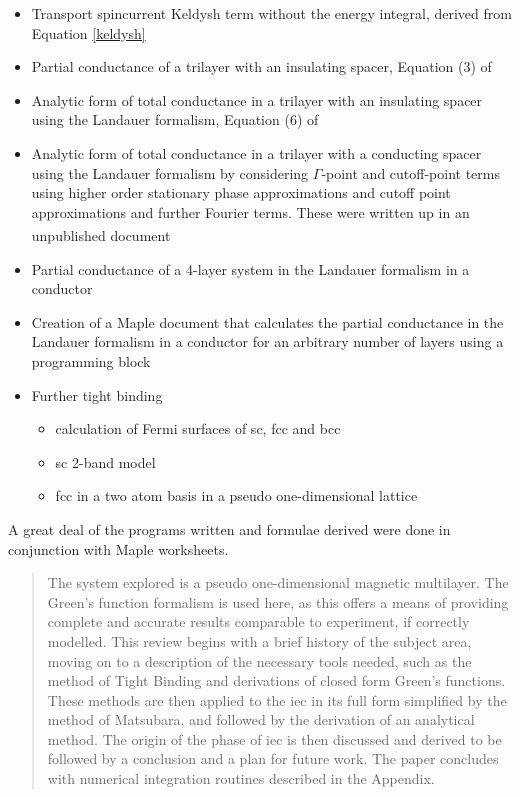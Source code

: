 \documentclass[a4paper, 12pt]{article}
\newcommand{\site}[1]{\textsuperscript{\textcolor{blue}{\cite{#1}}}}
\begin{document}
\begin{itemize}
	\item{Transport spincurrent Keldysh term without the energy integral, derived from Equation \eqref{keldysh}}
	\item{Partial conductance of a trilayer with an insulating spacer, Equation (3) of \textcolor{blue}{\cite{Mathon2016}}}
	\item{Analytic form of total conductance in a trilayer with an insulating spacer using the Landauer formalism, Equation (6) of \textcolor{blue}{\cite{Mathon2016}}}
	\item{Analytic form of total conductance in a trilayer with a conducting spacer using the Landauer formalism by considering $\Gamma$-point and cutoff-point terms using higher order stationary phase approximations and cutoff point approximations and further Fourier terms. These were written up in an unpublished document\site{me}}
	\item{Partial conductance of a 4-layer system in the Landauer formalism in a conductor}
	\item{Creation of a Maple document that calculates the partial conductance in the Landauer formalism in a conductor for an arbitrary number of layers using a programming block}
	\item{Further tight binding}
		\begin{itemize}
			\item{calculation of Fermi surfaces of \gls{sc}, \gls{fcc} and \acrfull{bcc}}
			\item{\gls{sc} 2-band model}
			\item{\gls{fcc} in a two atom basis in a pseudo one-dimensional lattice}
		\end{itemize}
\end{itemize}
A great deal of the programs written and formulae derived were done in conjunction with Maple worksheets.
\\[9mm]
	\begin{abstract}
		The system explored is a pseudo one-dimensional magnetic multilayer. The Green's function formalism is used here, as this offers a means of providing complete and accurate results comparable to experiment, if correctly modelled. This review begins with a brief history of the subject area, moving on to a description of the necessary tools needed, such as the method of Tight Binding and derivations of closed form Green's functions. These methods are then applied to the \gls{iec} in its full form simplified by the method of Matsubara, and followed by the derivation of an analytical method. The origin of the phase of \gls{iec} is then discussed and derived to be followed by a conclusion and a plan for future work. The paper concludes with numerical integration routines described in the Appendix.
	\end{abstract}
\end{document}
